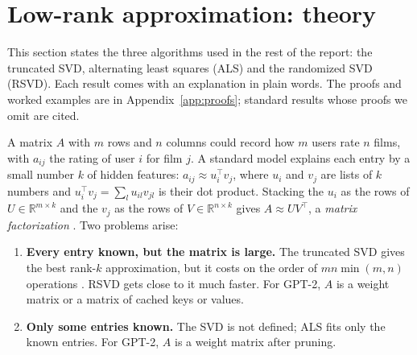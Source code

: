 \documentclass[10pt]{article}
\theoremstyle{plain}
\theoremstyle{definition}
\theoremstyle{remark}
\newcommand{\R}{\mathbb{R}}
\newcommand{\T}{^{\top}}
\begin{document}

\section{Low-rank approximation: theory}
\label{sec:theory}

This section states the three algorithms used in the rest of the report: the truncated SVD, alternating least squares (ALS) and the randomized SVD (RSVD). Each result comes with an explanation in plain words. The proofs and worked examples are in Appendix~\ref{app:proofs}; standard results whose proofs we omit are cited.

A matrix $A$ with $m$ rows and $n$ columns could record how $m$ users rate $n$ films, with $a_{ij}$ the rating of user $i$ for film $j$. A standard model explains each entry by a small number $k$ of hidden features: $a_{ij}\approx u_i\T v_j$, where $u_i$ and $v_j$ are lists of $k$ numbers and $u_i\T v_j=\sum_lu_{il}v_{jl}$ is their dot product. Stacking the $u_i$ as the rows of $U\in\R^{m\times k}$ and the $v_j$ as the rows of $V\in\R^{n\times k}$ gives $A\approx UV\T$, a \emph{matrix factorization} \cite{funk2006,paterek2007}. Two problems arise:
\begin{enumerate}[label=(P\arabic*),leftmargin=2.5em,itemsep=0pt]
\item \textbf{Every entry known, but the matrix is large.} The truncated SVD gives the best rank-$k$ approximation, but it costs on the order of $mn\min(m,n)$ operations \cite{golubvanloan2013}. RSVD \cite{halko2011} gets close to it much faster. For GPT-2, $A$ is a weight matrix or a matrix of cached keys or values.
\item \textbf{Only some entries known.} The SVD is not defined; ALS \cite{zhou2008,hu2008} fits only the known entries. For GPT-2, $A$ is a weight matrix after pruning.
\end{enumerate}
\end{document}
